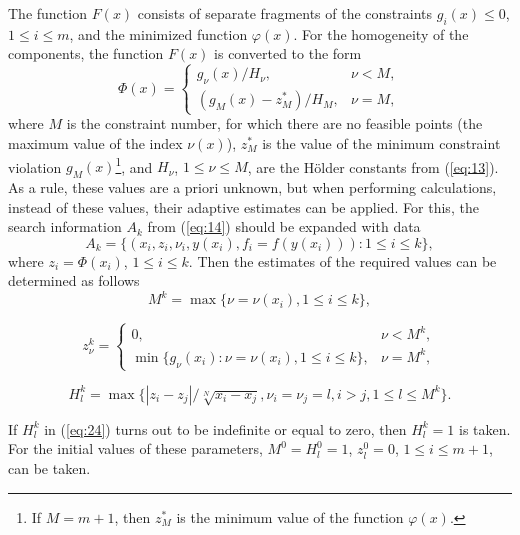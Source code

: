 \documentclass[smallextended]{svjour3}       %
\begin{document}
The function $F(x)$ consists of separate fragments of the constraints ${g_i(x) \leq 0}$, $1 \leq i \leq m$, and the minimized function $\varphi(x)$. For the homogeneity of the components, the function $F(x)$ is converted to the form 
\begin{equation}\label{eq:20}
\Phi (x) = 
 \begin{cases}
   g_\nu(x) / H_\nu, & \nu < M, \\
   (g_M(x)-z^*_M) / H_M, & \nu = M,
 \end{cases}
\end{equation}
where $M$ is the constraint number, for which there are no feasible points (the maximum value of the index $\nu(x)$), $z^*_M$ is the value of the minimum constraint violation $g_M(x)$\footnote{If $M=m+1$, then $z_M^*$ is the minimum value of the function $\varphi(x)$.}, and $H_\nu$, $1\leq \nu \leq M$, are the H\"older constants from (\ref{eq:13}). As a rule, these values are a priori unknown, but when performing calculations, instead of these values, their adaptive estimates can be applied. For this, the search information $A_k$ from (\ref{eq:14}) should be expanded with data
\begin{equation}\label{eq:21}
A_k=\{(x_i, z_i, \nu_i, y(x_i), f_i=f(y(x_i))): 1 \leq i \leq k \},
\end{equation}
where $z_i= \Phi(x_i)$, $1 \leq i \leq k$. Then the estimates of the required values can be determined as follows
\begin{equation}\label{eq:22}
M^k = \max{\{\nu=\nu(x_i), 1\leq i \leq k \}},
\end{equation}

\begin{equation}\label{eq:23}
z^k_\nu = 
 \begin{cases}
   0, & \nu < M^k, \\
   \min{\{g_\nu(x_i):\nu=\nu(x_i), 1\leq i \leq k \}}, & \nu = M^k,
 \end{cases}
\end{equation}

\begin{equation}\label{eq:24}
H^k_l=\max{\{|z_i-z_j|/\sqrt[N]{x_i-x_j}, \nu_i=\nu_j=l, i>j, 1\leq l\leq M^k\}}.
\end{equation}

If $H_l^k$ in (\ref{eq:24}) turns out to be indefinite or equal to zero, then $H_l^k=1$ is taken. For the initial values of these parameters, $M^0 = H_l^0 = 1$, $z_l^0 = 0$, $1 \leq i \leq m+1$, can be taken.
\end{document}
